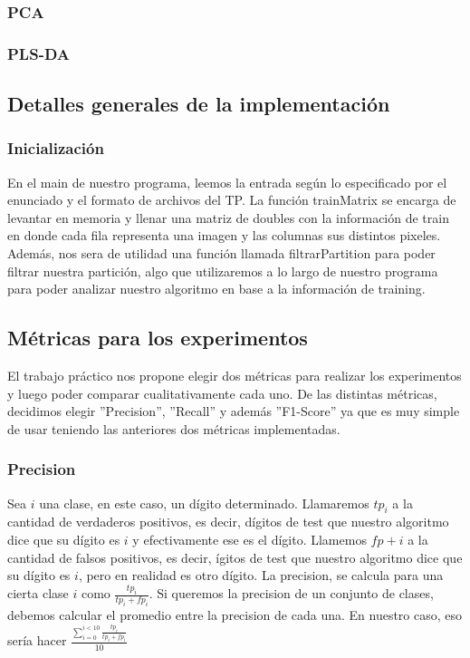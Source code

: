 \subsubsection{PCA}

\subsubsection{PLS-DA}

\subsection{Detalles generales de la implementaci\'on}

\subsubsection{Inicializaci\'on}

En el main de nuestro programa, leemos la entrada seg\'un lo especificado por el enunciado y el formato de archivos del TP. La funci\'on trainMatrix se encarga de levantar en memoria y llenar una matriz de doubles con la informaci\'on de train en donde cada fila representa una imagen y las columnas sus distintos pixeles. Adem\'as, nos sera de utilidad una funci\'on llamada filtrarPartition para poder filtrar nuestra partici\'on, algo que utilizaremos a lo largo de nuestro programa para poder analizar nuestro algoritmo en base a la informaci\'on de training.

\subsection{M\'etricas para los experimentos}

El trabajo pr\'actico nos propone elegir dos m\'etricas para realizar los experimentos y luego poder comparar cualitativamente cada uno. De las distintas m\'etricas, decidimos elegir ''Precision'', ''Recall'' y adem\'as ''F1-Score'' ya que es muy simple de usar teniendo las anteriores dos m\'etricas implementadas.

\subsubsection{Precision}

Sea $i$ una clase, en este caso, un d\'igito determinado. Llamaremos $tp_i$ a la cantidad de verdaderos positivos, es decir, d\'igitos de test que nuestro algoritmo dice que su d\'igito es $i$ y efectivamente ese es el d\'igito. Llamemos $fp+i$ a la cantidad de falsos positivos, es decir, \'igitos de test que nuestro algoritmo dice que su d\'igito es $i$, pero en realidad es otro d\'igito. La precision, se calcula para una cierta clase $i$ como $\frac{tp_i}{tp_i+fp_i}$. Si queremos la precision de un conjunto de clases, debemos calcular el promedio entre la precision de cada una. En nuestro caso, eso ser\'ia hacer $\frac{\sum_{i=0}^{i<10} \frac{tp_i}{tp_i+fp_i}}{10} $\\

